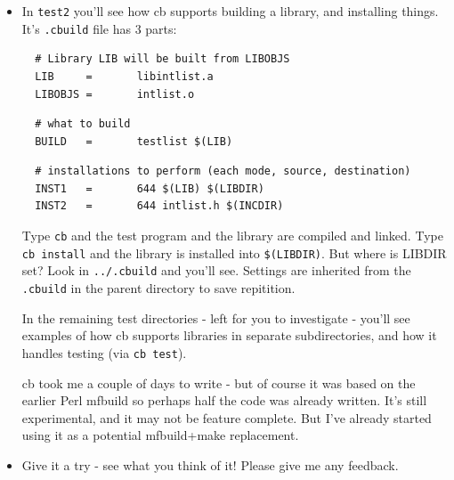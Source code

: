 \documentclass[handout]{beamer}
\begin{document}
\begin{frame}[fragile]
  \begin{itemize}

  \item
  In \verb+test2+ you'll see how \alert{cb} supports building a library,
  and installing things.  It's \verb+.cbuild+ file has 3 parts:

\tiny
\begin{verbatim}
  # Library LIB will be built from LIBOBJS
  LIB     =       libintlist.a
  LIBOBJS =       intlist.o
\end{verbatim}

\pause
\begin{verbatim}
  # what to build
  BUILD   =       testlist $(LIB)
\end{verbatim}

\pause
\begin{verbatim}
  # installations to perform (each mode, source, destination)
  INST1   =       644 $(LIB) $(LIBDIR)
  INST2   =       644 intlist.h $(INCDIR)
\end{verbatim}
\small

  \pitem
  Type \verb+cb+ and the test program and the library are compiled
  and linked.  Type \verb+cb install+ and the library is installed
  into \verb+$(LIBDIR)+.  But where is LIBDIR set?  Look in
  \verb+../.cbuild+ and you'll see.  Settings are inherited from
  the \verb+.cbuild+ in the parent directory to save repitition.

  \pitem
  In the remaining test directories - left for you to investigate -
  you'll see examples of how \alert{cb} supports libraries in separate
  subdirectories,
  and how it handles testing (via \verb+cb test+).

  \pitem
  \alert{cb} took me a couple of days to write - but of course it was
  based on the earlier Perl \alert{mfbuild} so perhaps half the code
  was already written.  It's still experimental, and it may not be
  feature complete.  But I've already started using it
  as a potential \alert{mfbuild+make} replacement.
  
  \item
  Give it a try - see what you think of it!  Please give me any feedback.

  \end{itemize}
\end{frame}
\end{document}
